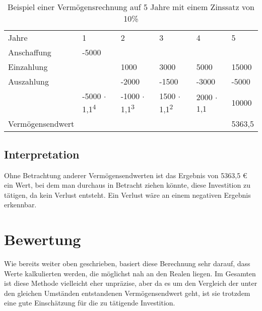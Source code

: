\begin{table}[!h]
    \begin{tabular}{llllll}
        \cline{1-6} \rowcolor{gray}
        Jahre            & 1                                    & 2                                    & 3                                   & 4                & 5      \\ \cline{1-6} \rowcolor{white}
        Anschaffung      & -5000                                &                                      &                                     &                  &        \\ \cline{1-6} \rowcolor{white}
        Einzahlung       &                                      & 1000                                 & 3000                                & 5000             & 15000  \\ \cline{1-6} \rowcolor{white}
        Auszahlung       &                                      & -2000                                & -1500                               & -3000            & -5000  \\ \cline{1-6} \rowcolor{white}
                         & -5000 $\cdot$ 1,1\textsuperscript{4} & -1000 $\cdot$ 1,1\textsuperscript{3} & 1500 $\cdot$ 1,1\textsuperscript{2} & 2000 $\cdot$ 1,1 & 10000  \\ \rowcolor{white}
        Vermögensendwert &                                      &                                      &                                     &                  & 5363,5 \\ \cline{1-6}
    \end{tabular}
    \caption{Beispiel einer Vermögensrechnung auf 5 Jahre mit einem Zinssatz von 10\%}
    \label{tb:VermoegensendwertRechnung}
\end{table}

\subsection{Interpretation}

Ohne Betrachtung anderer Vermögensendwerten ist das Ergebnis von 5363,5 € ein Wert, bei dem man durchaus in Betracht ziehen könnte, diese Investition zu tätigen, da kein Verlust entsteht. Ein Verlust wäre an einem negativen Ergebnis erkennbar.

\section{Bewertung}

Wie bereits weiter oben geschrieben, basiert diese Berechnung sehr darauf, dass Werte kalkulierten werden, die möglichst nah an den Realen liegen. Im Gesamten ist diese Methode vielleicht eher unpräzise, aber da es um den Vergleich der unter den gleichen Umständen entstandenen Vermögensendwert geht, ist sie trotzdem eine gute Einschätzung für die zu tätigende Investition.
